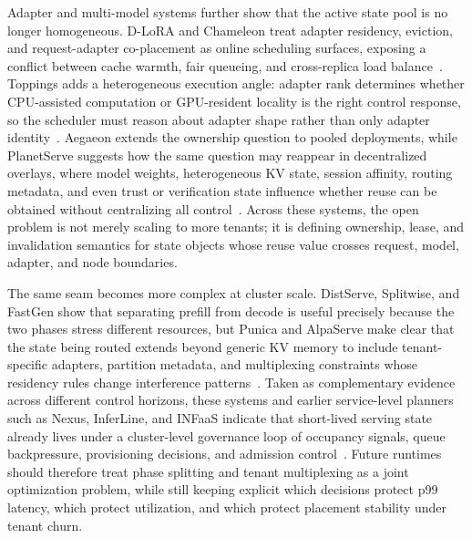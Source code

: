 \documentclass[acmsmall,screen,review]{acmart}
\begin{document}
Adapter and multi-model systems further show that the active state pool is no longer homogeneous. D-LoRA and Chameleon treat adapter residency, eviction, and request-adapter co-placement as online scheduling surfaces, exposing a conflict between cache warmth, fair queueing, and cross-replica load balance~\cite{wu2024dlora,iliakopoulou2024chameleon}. Toppings adds a heterogeneous execution angle: adapter rank determines whether CPU-assisted computation or GPU-resident locality is the right control response, so the scheduler must reason about adapter shape rather than only adapter identity~\cite{li2025toppings}. Aegaeon extends the ownership question to pooled deployments, while PlanetServe suggests how the same question may reappear in decentralized overlays, where model weights, heterogeneous KV state, session affinity, routing metadata, and even trust or verification state influence whether reuse can be obtained without centralizing all control~\cite{xiang2025aegaeon,fang2026planetserve}. Across these systems, the open problem is not merely scaling to more tenants; it is defining ownership, lease, and invalidation semantics for state objects whose reuse value crosses request, model, adapter, and node boundaries.

The same seam becomes more complex at cluster scale. DistServe, Splitwise, and FastGen show that separating prefill from decode is useful precisely because the two phases stress different resources, but Punica and AlpaServe make clear that the state being routed extends beyond generic KV memory to include tenant-specific adapters, partition metadata, and multiplexing constraints whose residency rules change interference patterns~\cite{zhong2024distserve,patel2024splitwise,holmes2024fastgen,chen2024punica,li2023alpaserve}. Taken as complementary evidence across different control horizons, these systems and earlier service-level planners such as Nexus, InferLine, and INFaaS indicate that short-lived serving state already lives under a cluster-level governance loop of occupancy signals, queue backpressure, provisioning decisions, and admission control~\cite{shen2019nexus,crankshaw2020inferline,romero2021infaas}. Future runtimes should therefore treat phase splitting and tenant multiplexing as a joint optimization problem, while still keeping explicit which decisions protect p99 latency, which protect utilization, and which protect placement stability under tenant churn.
\end{document}
